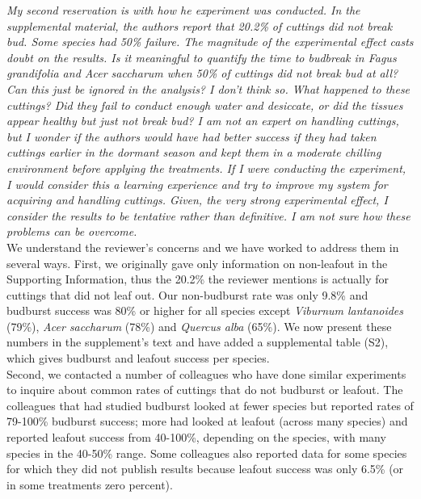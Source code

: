 \documentclass[11pt,a4paper]{article}
\begin{document}
\emph{My second reservation is with how he experiment was conducted. In the supplemental material,
the authors report that 20.2\% of cuttings did not break bud. Some species had 50\% failure.
The magnitude of the experimental effect casts doubt on the results.  Is it meaningful to
quantify the time to budbreak in Fagus grandifolia and Acer saccharum when 50\% of cuttings
did not break bud at all?  Can this just be ignored in the analysis?  I don’t think so. What
happened to these cuttings?  Did they fail to conduct enough water and desiccate, or did the
tissues appear healthy but just not break bud? I am not an expert on handling cuttings, but I
wonder if the authors would have had better success if they had taken cuttings earlier in the
dormant season and kept them in a moderate chilling environment before applying the
treatments. If I were conducting the experiment, I would consider this a learning experience
and try to improve my system for acquiring and handling cuttings.  Given, the very strong
experimental effect, I consider the results to be tentative rather than definitive. I am not
sure how these problems can be overcome.}\\

We understand the reviewer's concerns and we have worked to address them in several ways. First, we originally gave only information on non-leafout in the Supporting Information, thus the 20.2\% the reviewer mentions is actually for cuttings that did not leaf out. Our non-budburst rate was only 9.8\% and budburst success was 80\% or higher for all species except \emph{Viburnum lantanoides} (79\%), \emph{Acer saccharum} (78\%) and \emph{Quercus alba} (65\%). We now present these numbers in the supplement's text and have added a supplemental table (S2), which gives budburst and leafout success per species. \\

Second, we contacted a number of colleagues who have done similar experiments \citep[colleagues contacted included authors on the following paper][]{Caffarra:2011aa,Basler:2012aa,Polgar:2014aa,vitasseclippings,zohner2016ncc} to inquire about common rates of cuttings that do not budburst or leafout. The colleagues that had studied budburst looked at fewer species but reported rates of 79-100\% budburst success; more had looked at leafout (across many species) and reported leafout success from 40-100\%, depending on the species, with many species in the 40-50\% range. Some colleagues also reported data for some species for which they did not publish results because leafout success was only 6.5\% (or in some treatments zero percent). \\
\end{document}
